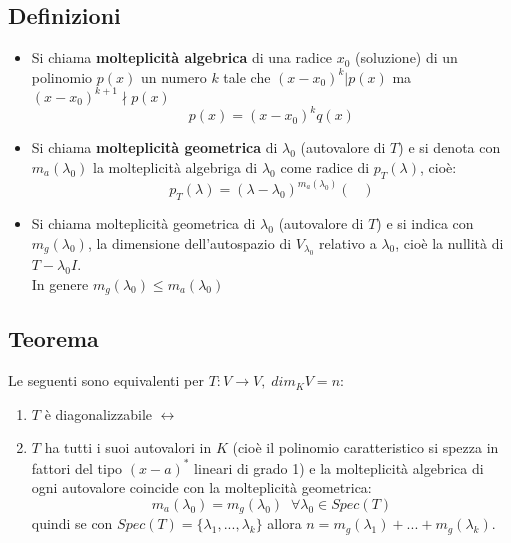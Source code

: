 \subsection{Definizioni}
\begin{itemize}
\item Si chiama \textbf{molteplicità algebrica} di una radice $x_0$ (soluzione) di un polinomio $p(x)$ un numero $k$ tale che $(x-x_0)^k|p(x)$ ma $(x-x_0)^{k+1}\nmid p(x)$
  \[p(x)=(x-x_0)^kq(x)\]

\item Si chiama \textbf{molteplicità geometrica} di $\lambda_0$ (autovalore di $T$) e si denota con $m_a(\lambda_0)$ la molteplicità algebriga di $\lambda_0$ come radice di $p_T(\lambda)$, cioè:
  \[p_T(\lambda)=(\lambda -\lambda_0)^{m_a(\lambda_0)}(\;\;\;)\]

\item Si chiama molteplicità geometrica di $\lambda_0$ (autovalore di $T$) e si indica con $m_g(\lambda_0)$, la dimensione dell'autospazio di $V_{\lambda_0}$ relativo a $\lambda_0$, cioè la nullità di $T-\lambda_0 I$.
  \\In genere $m_g(\lambda_0)\leq m_a(\lambda_0)$

\end{itemize}

\subsection{Teorema}
Le seguenti sono equivalenti per $T:V\rightarrow V, \; dim_KV=n$:
\begin{enumerate}
\item $T$ è diagonalizzabile $\leftrightarrow $

\item $T$ ha tutti i suoi autovalori in $K$ (cioè il polinomio caratteristico si spezza in fattori del tipo $(x-a)^*$ lineari di grado 1) e la molteplicità algebrica di ogni autovalore coincide con la molteplicità geometrica:
  \[m_a(\lambda_0)=m_g(\lambda_0)\;\;\forall\lambda_0\in Spec(T)\]
  quindi se con $Spec(T)=\{\lambda_1,...,\lambda_k\}$ allora $n=m_g(\lambda_1)+...+m_g(\lambda_k)$.

\end{enumerate}
